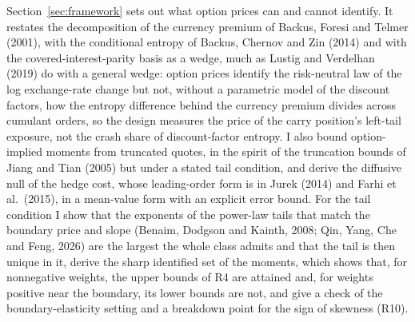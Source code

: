 \documentclass[11pt]{article}
\theoremstyle{result}
\begin{document}
Section~\ref{sec:framework} sets out what option prices can and cannot identify. It restates the decomposition of the currency premium of Backus, Foresi and Telmer (2001), with the conditional entropy of Backus, Chernov and Zin (2014) and with the covered-interest-parity basis as a wedge, much as Lustig and Verdelhan (2019) do with a general wedge: option prices identify the risk-neutral law of the log exchange-rate change but not, without a parametric model of the discount factors, how the entropy difference behind the currency premium divides across cumulant orders, so the design measures the price of the carry position's left-tail exposure, not the crash share of discount-factor entropy. I also bound option-implied moments from truncated quotes, in the spirit of the truncation bounds of Jiang and Tian (2005) but under a stated tail condition, and derive the diffusive null of the hedge cost, whose leading-order form is in Jurek (2014) and Farhi et al.\ (2015), in a mean-value form with an explicit error bound. For the tail condition I show that the exponents of the power-law tails that match the boundary price and slope (Benaim, Dodgson and Kainth, 2008; Qin, Yang, Che and Feng, 2026) are the largest the whole class admits and that the tail is then unique in it, derive the sharp identified set of the moments, which shows that, for nonnegative weights, the upper bounds of R4 are attained and, for weights positive near the boundary, its lower bounds are not, and give a check of the boundary-elasticity setting and a breakdown point for the sign of skewness (R10).
\end{document}

